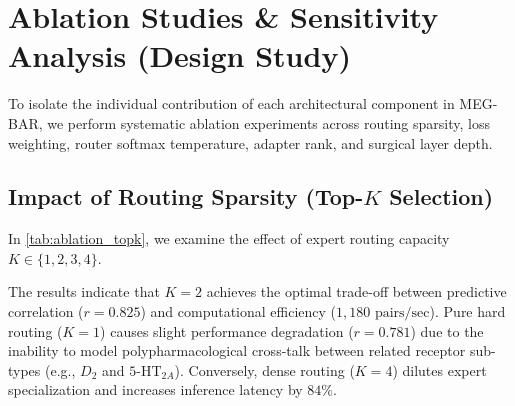 \documentclass{article}
\theoremstyle{definition}
\begin{document}
\section{Ablation Studies \& Sensitivity Analysis (Design Study)}
\label{sec:ablations}

To isolate the individual contribution of each architectural component in MEG-BAR, we perform systematic ablation experiments across routing sparsity, loss weighting, router softmax temperature, adapter rank, and surgical layer depth.

\subsection{Impact of Routing Sparsity (Top-\texorpdfstring{$K$}{K} Selection)}
In \cref{tab:ablation_topk}, we examine the effect of expert routing capacity $K \in \{1, 2, 3, 4\}$.

\begin{table}[!ht]
\centering
\small
\caption{\textbf{Ablation Study on Top-$K$ Routing Sparsity.} Predictive correlation, inference throughput, and active FLOP ratio across top-$K$ selection values ($N = 4$ total experts). \emph{Simulation output (\cref{sec:evidentiary_scope}).}}
\label{tab:ablation_topk}
\end{table}

The results indicate that $K = 2$ achieves the optimal trade-off between predictive correlation ($r = 0.825$) and computational efficiency ($1,180\text{ pairs/sec}$). Pure hard routing ($K = 1$) causes slight performance degradation ($r = 0.781$) due to the inability to model polypharmacological cross-talk between related receptor sub-types (e.g., $D_2$ and $5\text{-HT}_{2A}$). Conversely, dense routing ($K = 4$) dilutes expert specialization and increases inference latency by $84\%$.
\end{document}
